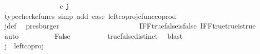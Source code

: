\begin{isabellebody}
\ {\isacharminus}{\kern0pt}\ \isanewline
\ \ \ \ \ \ \isamarkupfalse%
\ {\isachardoublequoteopen}{\isacharparenleft}{\kern0pt}{\isasymlangle}{\isasymt}{\isacharcomma}{\kern0pt}\ {\isasymt}{\isasymrangle}{\isasymamalg}\ {\isacharparenleft}{\kern0pt}{\isasymlangle}{\isasymf}{\isacharcomma}{\kern0pt}\ {\isasymf}{\isasymrangle}\ {\isasymamalg}{\isasymlangle}{\isasymf}{\isacharcomma}{\kern0pt}\ {\isasymt}{\isasymrangle}{\isacharparenright}{\kern0pt}{\isacharparenright}{\kern0pt}\ {\isasymcirc}\isactrlsub c\ j\ {\isacharequal}{\kern0pt}\ {\isasymlangle}{\isasymt}{\isacharcomma}{\kern0pt}\ {\isasymt}{\isasymrangle}{\isachardoublequoteclose}\isanewline
\ \ \ \ \ \ \ \ \isamarkupfalse%
\ {\isacharparenleft}{\kern0pt}typecheck{\isacharunderscore}{\kern0pt}cfuncs{\isacharcomma}{\kern0pt}\ simp\ add{\isacharcolon}{\kern0pt}\ case{}\ left{\isacharunderscore}{\kern0pt}coproj{\isacharunderscore}{\kern0pt}cfunc{\isacharunderscore}{\kern0pt}coprod{\isacharparenright}{\kern0pt}\isanewline
\ \ \ \ \ \ \isamarkupfalse%
\ \isamarkupfalse%
\ {\isachardoublequoteopen}{\isasymlangle}{\isasymt}{\isacharcomma}{\kern0pt}\ {\isasymt}{\isasymrangle}\ {\isacharequal}{\kern0pt}\ {\isasymlangle}{\isasymt}{\isacharcomma}{\kern0pt}{\isasymf}{\isasymrangle}{\isachardoublequoteclose}\isanewline
\ \ \ \ \ \ \ \ \isamarkupfalse%
\ j{\isacharunderscore}{\kern0pt}def\ \isamarkupfalse%
\ presburger\isanewline
\ \ \ \ \ \ \isamarkupfalse%
\ \isamarkupfalse%
\ {\isachardoublequoteopen}{\isasymt}\ {\isacharequal}{\kern0pt}\ {\isasymf}{\isachardoublequoteclose}\isanewline
\ \ \ \ \ \ \ \ \isamarkupfalse%
\ IFF{\isacharunderscore}{\kern0pt}true{\isacharunderscore}{\kern0pt}false{\isacharunderscore}{\kern0pt}is{\isacharunderscore}{\kern0pt}false\ IFF{\isacharunderscore}{\kern0pt}true{\isacharunderscore}{\kern0pt}true{\isacharunderscore}{\kern0pt}is{\isacharunderscore}{\kern0pt}true\ \isamarkupfalse%
\ auto\isanewline
\ \ \ \ \ \ \isamarkupfalse%
\ \isamarkupfalse%
\ False\isanewline
\ \ \ \ \ \ \ \ \isamarkupfalse%
\ true{\isacharunderscore}{\kern0pt}false{\isacharunderscore}{\kern0pt}distinct\ \isamarkupfalse%
\ blast\isanewline
\ \ \ \ \isamarkupfalse%
\isanewline
\ \ \isamarkupfalse%
\isanewline
\ \ \ \ \isamarkupfalse%
\ {\isachardoublequoteopen}j\ {\isasymnoteq}\ left{\isacharunderscore}{\kern0pt}coproj\ {\isasymone}\ {\isacharparenleft}{\kern0pt}{\isasymone}\ {\isasymCoprod}\ {\isasymone}{\isacharparenright}{\kern0pt}{\isachardoublequoteclose}\isanewline

\end{isabellebody}
